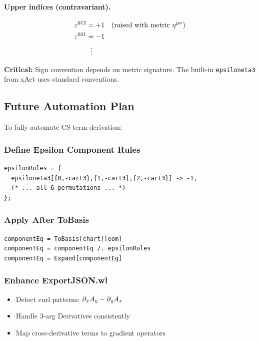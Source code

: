 \paragraph{Upper indices (contravariant).}
\label{par:cs-upper-epsilon}
\begin{align}
  \varepsilon^{012} &= +1 \quad\text{(raised with metric $\eta^{\mu\nu}$)} \notag \\
  \varepsilon^{021} &= -1 \notag \\
  &\;\;\vdots \notag
\end{align}

\textbf{Critical:} Sign convention depends on metric signature. The built-in \texttt{epsiloneta3} from xAct uses standard conventions.

\subsection{Future Automation Plan}
\label{sec:cs-future}

To fully automate CS term derivation:

\subsubsection{Define Epsilon Component Rules}
\label{sec:cs-future-epsilon}

\begin{lstlisting}[style=mathematica]
epsilonRules = {
  epsiloneta3[{0,-cart3},{1,-cart3},{2,-cart3}] -> -1,
  (* ... all 6 permutations ... *)
};
\end{lstlisting}

\subsubsection{Apply After ToBasis}
\label{sec:cs-future-tobasis}

\begin{lstlisting}[style=mathematica]
componentEq = ToBasis[chart][eom]
componentEq = componentEq /. epsilonRules
componentEq = Expand[componentEq]
\end{lstlisting}

\subsubsection{Enhance ExportJSON.wl}
\label{sec:cs-future-export}

\begin{itemize}
  \item Detect curl patterns: $\partial_x A_y - \partial_y A_x$
  \item Handle 3-arg Derivatives consistently
  \item Map cross-derivative terms to gradient operators
\end{itemize}

